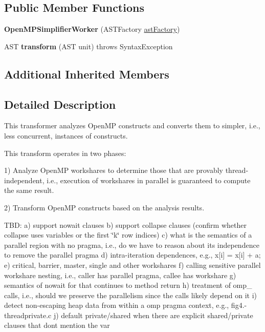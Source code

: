 \subsection*{Public Member Functions}
\begin{DoxyCompactItemize}
\item 
\hypertarget{classedu_1_1udel_1_1cis_1_1vsl_1_1civl_1_1transform_1_1common_1_1OpenMPSimplifierWorker_aab8865ccf17278a92ffad788db0e1d57}{}{\bfseries Open\+M\+P\+Simplifier\+Worker} (A\+S\+T\+Factory \hyperlink{classedu_1_1udel_1_1cis_1_1vsl_1_1civl_1_1transform_1_1common_1_1BaseWorker_a44812bb476e4511fb6ca29a808427186}{ast\+Factory})\label{classedu_1_1udel_1_1cis_1_1vsl_1_1civl_1_1transform_1_1common_1_1OpenMPSimplifierWorker_aab8865ccf17278a92ffad788db0e1d57}

\item 
\hypertarget{classedu_1_1udel_1_1cis_1_1vsl_1_1civl_1_1transform_1_1common_1_1OpenMPSimplifierWorker_a3d539ecb233d163d9ccfdbfb51487183}{}A\+S\+T {\bfseries transform} (A\+S\+T unit)  throws Syntax\+Exception \label{classedu_1_1udel_1_1cis_1_1vsl_1_1civl_1_1transform_1_1common_1_1OpenMPSimplifierWorker_a3d539ecb233d163d9ccfdbfb51487183}

\end{DoxyCompactItemize}
\subsection*{Additional Inherited Members}


\subsection{Detailed Description}
This transformer analyzes Open\+M\+P constructs and converts them to simpler, i.\+e., less concurrent, instances of constructs. 

This transform operates in two phases\+:

1) Analyze Open\+M\+P workshares to determine those that are provably thread-\/independent, i.\+e., execution of workshares in parallel is guaranteed to compute the same result.

2) Transform Open\+M\+P constructs based on the analysis results.

T\+B\+D\+: a) support nowait clauses b) support collapse clauses (confirm whether collapse uses variables or the first \char`\"{}k\char`\"{} row indices) c) what is the semantics of a parallel region with no pragma, i.\+e., do we have to reason about its independence to remove the parallel pragma d) intra-\/iteration dependences, e.\+g., x\mbox{[}i\mbox{]} = x\mbox{[}i\mbox{]} + a; e) critical, barrier, master, single and other workshares f) calling sensitive parallel workshare nesting, i.\+e., caller has parallel pragma, callee has workshare g) semantics of nowait for that continues to method return h) treatment of omp\+\_\+ calls, i.\+e., should we preserve the parallelism since the calls likely depend on it i) detect non-\/escaping heap data from within a omp pragma context, e.\+g., fig4.-\/threadprivate.\+c j) default private/shared when there are explicit shared/private clauses that don\textquotesingle{}t mention the var

